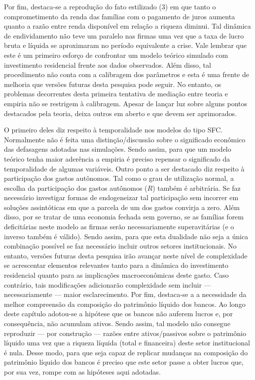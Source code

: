 Por fim, destaca-se a reprodução do fato estilizado (3) em que tanto o comprometimento da renda das famílias com o pagamento de juros aumenta quanto a razão entre renda disponível em relação a riqueza diminui. Tal dinâmica de endividamento não teve um paralelo nas firmas uma vez que a taxa de lucro bruta e líquida se aproximaram no período equivalente a crise. 
Vale lembrar que este é um primeiro esforço de confrontar um modelo teórico simulado com investimento residencial frente aos dados observados.
Além disso, tal procedimento não conta com a calibragem dos parâmetros e esta é uma frente de melhoria que versões futuras desta pesquisa pode seguir.
No entanto, os problemas decorrentes desta primeira tentativa de mediação entre teoria e empiria não se restrigem à calibragem. 
Apesar de lançar luz sobre alguns pontos destacados pela teoria, deixa outros em aberto e que devem ser aprimorados.

O primeiro deles diz respeito à temporalidade nos modelos do tipo SFC. Normalmente não é feita uma distinção/discussão sobre o significado econômico das defasagens adotadas nas simulações. Sendo assim, para que um modelo teórico tenha maior aderência a empiria é preciso repensar o significado da temporalidade de algumas variáveis. Outro ponto a ser destacado diz respeito à participação dos gastos autônomos. Tal como o grau de utilização normal, a escolha da participação dos gastos autônomos ($R$) também é arbitrária. Se faz necessário investigar formas de endogeneizar tal participação sem incorrer em soluções assintóticas em que a parcela de um dos gastos convirja a zero. Além disso, por se tratar de uma economia fechada sem governo, se as famílias forem deficitárias neste modelo as firmas serão necessariamente superavitárias (e o inverso também é válido).
Sendo assim, para que esta dualidade não seja a única combinação possível se faz necessário incluir outros setores institucionais. No entanto, versões futuras desta pesquisa irão avançar neste nível de complexidade se acrescentar elementos relevantes tanto para a dinâmica do investimento residencial quanto para as implicações macroeconômicas deste gasto. Caso contrário, tais modificações adicionarão complexidade sem incluir --- necessariamente --- maior esclarecimento.
Por fim, destaca-se a a necessidade da melhor compreensão da composição do patrimônio líquido dos bancos. Ao longo deste capítulo adotou-se a hipótese que os bancos não auferem lucros e, por consequência, não acumulam ativos.
Sendo assim, tal modelo não consegue reproduzir --- por construção --- razões entre ativos/passivos sobre o patrimônio líquido uma vez que a riqueza líquida (total e financeira) deste setor institucional é nula.
Desse modo, para que seja capaz de replicar mudanças na composição do patrimônio líquido dos bancos é preciso que este setor passe a obter lucros que, por sua vez, rompe com as hipóteses aqui adotadas.

